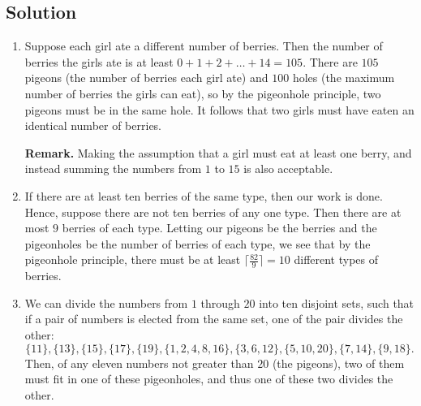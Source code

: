 \documentclass{article}
\begin{document}
\subsection*{Solution}
    \begin{enumerate}
        \item Suppose each girl ate a different number of berries. Then the number of berries the girls ate is at least $0 + 1 + 2 + \dots + 14 = 105$. There are $105$ pigeons (the number of berries each girl ate) and $100$ holes (the maximum number of berries the girls can eat), so by the pigeonhole principle, two pigeons must be in the same hole. It follows that two girls must have eaten an identical number of berries.
        
        \vspace{1mm}
        \textbf{Remark.} Making the assumption that a girl must eat at least one berry, and instead summing the numbers from $1$ to $15$ is also acceptable.
        \item If there are at least ten berries of the same type, then our work is done. Hence, suppose there are not ten berries of any one type. Then there are at most $9$ berries of each type. Letting our pigeons be the berries and the pigeonholes be the number of berries of each type, we see that by the pigeonhole principle, there must be at least $\lceil \frac{82}{9} \rceil = 10$ different types of berries.
        \item We can divide the numbers from $1$ through $20$ into ten disjoint sets, such that if a pair of numbers is elected from the same set, one of the pair divides the other: $$\{11\}, \{13\}, \{15\}, \{17\}, \{19\}, \{1, 2, 4, 8, 16\}, \{3, 6, 12\}, \{5, 10, 20\}, \{7, 14\}, \{9, 18\}.$$ Then, of any eleven numbers not greater than $20$ (the pigeons), two of them must fit in one of these pigeonholes, and thus one of these two divides the other.
    \end{enumerate}
\end{document}
